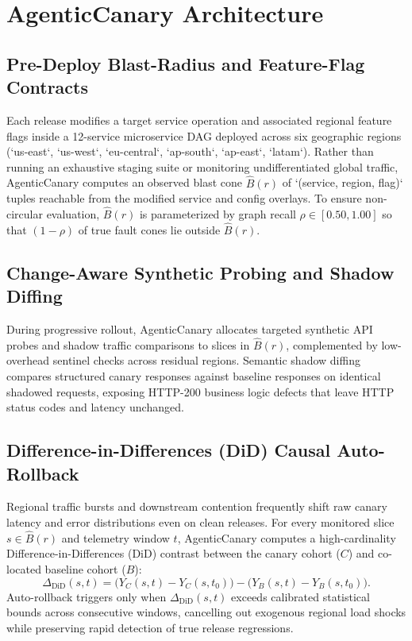 \section{AgenticCanary Architecture}
\label{sec:methodology}

\subsection{Pre-Deploy Blast-Radius and Feature-Flag Contracts}
Each release modifies a target service operation and associated regional feature flags inside a 12-service microservice DAG deployed across six geographic regions (`us-east`, `us-west`, `eu-central`, `ap-south`, `ap-east`, `latam`). Rather than running an exhaustive staging suite or monitoring undifferentiated global traffic, AgenticCanary computes an observed blast cone $\hat{B}(r)$ of `(service, region, flag)` tuples reachable from the modified service and config overlays. To ensure non-circular evaluation, $\hat{B}(r)$ is parameterized by graph recall $\rho \in [0.50, 1.00]$ so that $(1-\rho)$ of true fault cones lie outside $\hat{B}(r)$.

\subsection{Change-Aware Synthetic Probing and Shadow Diffing}
During progressive rollout, AgenticCanary allocates targeted synthetic API probes and shadow traffic comparisons to slices in $\hat{B}(r)$, complemented by low-overhead sentinel checks across residual regions. Semantic shadow diffing compares structured canary responses against baseline responses on identical shadowed requests, exposing HTTP-200 business logic defects that leave HTTP status codes and latency unchanged.

\subsection{Difference-in-Differences (DiD) Causal Auto-Rollback}
Regional traffic bursts and downstream contention frequently shift raw canary latency and error distributions even on clean releases. For every monitored slice $s \in \hat{B}(r)$ and telemetry window $t$, AgenticCanary computes a high-cardinality Difference-in-Differences (DiD) contrast between the canary cohort ($C$) and co-located baseline cohort ($B$):
\begin{equation}
\Delta_{\text{DiD}}(s, t) = \big(Y_{C}(s,t) - Y_{C}(s, t_0)\big) - \big(Y_{B}(s,t) - Y_{B}(s, t_0)\big).
\end{equation}
Auto-rollback triggers only when $\Delta_{\text{DiD}}(s, t)$ exceeds calibrated statistical bounds across consecutive windows, cancelling out exogenous regional load shocks while preserving rapid detection of true release regressions.

